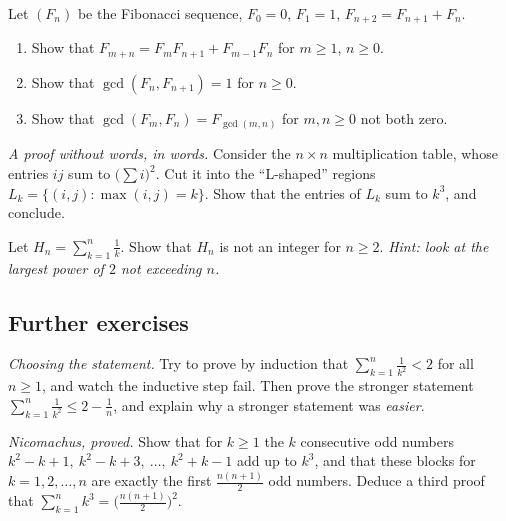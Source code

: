 \begin{exercise}[$\star\star$]\label{ex:fibgcd}
Let $(F_n)$ be the Fibonacci sequence, $F_0=0$, $F_1=1$, $F_{n+2}=F_{n+1}+F_n$.
\begin{enumerate}[label=(\alph*)]
\item Show that $F_{m+n}=F_{m}F_{n+1}+F_{m-1}F_n$ for $m\ge1$, $n\ge0$.
\item Show that $\gcd(F_n,F_{n+1})=1$ for $n\ge0$.
\item Show that $\gcd(F_m,F_n)=F_{\gcd(m,n)}$ for $m,n\ge0$ not both zero.
\end{enumerate}
\end{exercise}

\begin{exercise}[$\star\star$]\label{ex:cubesgeo}
\emph{A proof without words, in words.} Consider the $n\times n$ multiplication table, whose entries
$ij$ sum to $\bigl(\sum i\bigr)^2$. Cut it into the ``L-shaped'' regions
$L_k=\{(i,j):\max(i,j)=k\}$. Show that the entries of $L_k$ sum to $k^3$, and conclude.
\end{exercise}

\begin{exercise}[$\star\star\star$]\label{ex:harmonic}
Let $H_n=\sum_{k=1}^n\frac1k$. Show that $H_n$ is not an integer for $n\ge2$.
\emph{Hint: look at the largest power of $2$ not exceeding $n$.}
\end{exercise}

\subsection*{Further exercises}

\begin{exercise}[$\star$]\label{ex:sumsq}
\emph{Choosing the statement.} Try to prove by induction that $\sum_{k=1}^n\frac1{k^2}<2$ for all $n\ge1$, and watch the inductive step fail. Then prove the
stronger statement $\sum_{k=1}^n\frac1{k^2}\le2-\frac1n$, and explain why a stronger statement was \emph{easier}.
\end{exercise}

\begin{exercise}[$\star$]\label{ex:odds}
\emph{Nicomachus, proved.} Show that for $k\ge1$ the $k$ consecutive odd numbers $k^2-k+1,\ k^2-k+3,\ \dots,\ k^2+k-1$ add up to $k^3$, and that these
blocks for $k=1,2,\dots,n$ are exactly the first $\frac{n(n+1)}2$ odd numbers. Deduce a third proof that $\sum_{k=1}^nk^3=\bigl(\frac{n(n+1)}2\bigr)^2$.
\end{exercise}


